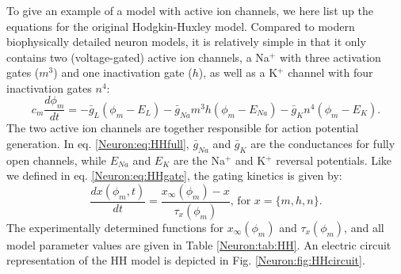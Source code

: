 \subsubsection{}
\label{sec:Neuron:HH}
To give an example of a model with active ion channels, we here list up the equations for the original Hodgkin-Huxley model. Compared to modern biophysically detailed neuron models, it is relatively simple in that it only contains two (voltage-gated) active ion channels, a Na$^+$ with three activation gates ($m^3$) and one inactivation gate ($h$), as well as a K$^+$ channel with four inactivation gates $n^4$:
\begin{equation}
c_m \frac{d\phi_m}{dt} = -\bar{g}_L(\phi_m-E_L) - \bar{g}_{Na} m^3 h (\phi_m - E_{Na}) - \bar{g}_{K} n^4 (\phi_m - E_{K}).
\label{Neuron:eq:HHfull}
\end{equation}
The two active ion channels are together responsible for action potential generation. In eq. \ref{Neuron:eq:HHfull}, $\bar{g}_{Na}$ and $\bar{g}_K$ are the conductances for fully open channels, while $E_{Na}$ and $E_{K}$ are the Na$^+$ and K$^+$ reversal potentials. Like we defined in eq. \ref{Neuron:eq:HHgate}, the gating kinetics is given by: 
\begin{equation}
\frac{dx(\phi_m,t)}{dt} = \frac{x_{\infty}(\phi_m) - x}{\tau_x(\phi_m)},  \, \text{for } x = \{m,h,n\}.
\label{Neuron:eq:HHgates}
\end{equation}
The experimentally determined functions for $x_{\infty}(\phi_m)$ and $\tau_x(\phi_m)$, and all model parameter values are given in Table \ref{Neuron:tab:HH}. An electric circuit representation of the HH model is depicted in Fig. \ref{Neuron:fig:HHcircuit}.

